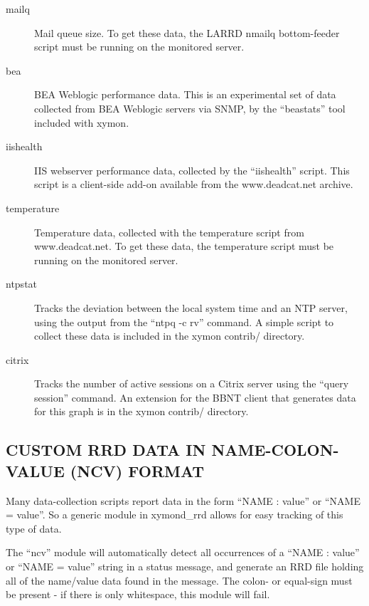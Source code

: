 \begin{description}
 

\item[mailq] Mail queue size. To get these data, the LARRD nmailq bottom-feeder script must be running on the monitored server. 

 

\item[bea] BEA Weblogic performance data. This is an experimental set of data collected from BEA Weblogic servers via SNMP, by the ``beastats'' tool included with xymon. 

 

\item[iishealth] IIS webserver performance data, collected by the ``iishealth'' script. This script is a client-side add-on available from the www.deadcat.net archive. 

 

\item[temperature] Temperature data, collected with the temperature script from www.deadcat.net. To get these data, the temperature script must be running on the monitored server. 

 

\item[ntpstat] Tracks the deviation between the local system time and an NTP server, using the output from the ``ntpq -c rv'' command. A simple script to collect these data is included in the xymon contrib/ directory. 

 

\item[citrix] Tracks the number of active sessions on a Citrix server using the ``query session'' command. An extension for the BBNT client that generates data for this graph is in the xymon contrib/ directory. 

 


 


\end{description}

\subsection{CUSTOM RRD DATA IN NAME-COLON-VALUE (NCV) FORMAT}
 Many data-collection scripts report data in the form ``NAME : value'' or ``NAME = value''. So a generic module in xymond\_rrd allows for easy tracking of this type of data. 

  The ``ncv'' module will automatically detect all occurrences of a ``NAME : value'' or ``NAME = value'' string in a status message, and generate an RRD file holding all of the name/value data found in the message. The colon- or equal-sign must be present - if there is only whitespace, this module will fail. 


